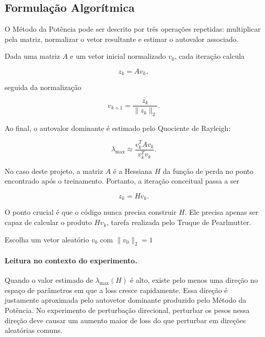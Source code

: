 \documentclass[12pt, a4paper]{article}
\begin{document}
\subsection{Formulação Algorítmica}

O Método da Potência pode ser descrito por três operações repetidas: multiplicar
pela matriz, normalizar o vetor resultante e estimar o autovalor associado.

Dada uma matriz \(A\) e um vetor inicial normalizado \(v_0\), cada iteração
calcula

\[
z_k = Av_k,
\]

seguida da normalização

\[
v_{k+1} = \frac{z_k}{\|z_k\|_2}.
\]

Ao final, o autovalor dominante é estimado pelo Quociente de Rayleigh:

\[
\lambda_{\max}
\approx
\frac{v_k^T A v_k}{v_k^T v_k}.
\]

No caso deste projeto, a matriz \(A\) é a Hessiana \(H\) da função de perda no
ponto encontrado após o treinamento. Portanto, a iteração conceitual passa a
ser

\[
z_k = H v_k.
\]

O ponto crucial é que o código nunca precisa construir \(H\). Ele precisa
apenas ser capaz de calcular o produto \(Hv_k\), tarefa realizada pelo Truque
de Pearlmutter.

\begin{algorithm}[H]
\DontPrintSemicolon
{}
\BlankLine
Escolha um vetor aleatório \(v_0\) com \(\|v_0\|_2=1\)\;
\;
\caption{Método da Potência aplicado à Hessiana implícita}
\label{alg:power_hessian}
\end{algorithm}

\paragraph{Leitura no contexto do experimento.}

Quando o valor estimado de \(\lambda_{\max}(H)\) é alto, existe pelo menos uma
direção no espaço de parâmetros em que a loss cresce rapidamente. Essa direção
é justamente aproximada pelo autovetor dominante produzido pelo Método da
Potência. No experimento de perturbação direcional, perturbar os pesos nessa
direção deve causar um aumento maior de loss do que perturbar em direções
aleatórias comuns.
\end{document}
